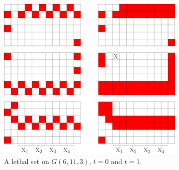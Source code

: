 \begin{figure}[]
\centering
\begin{subfigure}[t]{0.65\textwidth}
\centering
\includegraphics[width=\textwidth]{figures/7/6x11x3.pdf}
\caption{A lethal set on $G(6,11,3)$, $t=0$ and $t=1$.}
\label{fig:6x11x3}	
\end{subfigure} \hfill%
\begin{subfigure}[t]{0.2915\textwidth}
\centering

\end{subfigure}
\end{figure}
